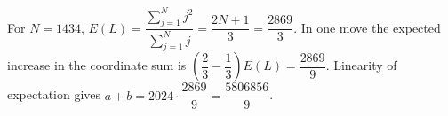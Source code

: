 For $N=1434$, $E(L)=\dfrac{\sum_{j=1}^N j^2}{\sum_{j=1}^N j}=\dfrac{2N+1}{3}=\dfrac{2869}{3}$. In one move the expected increase in the coordinate sum is $(\dfrac{2}{3}-\dfrac{1}{3})E(L)=\dfrac{2869}{9}$. Linearity of expectation gives $a+b=2024\cdot\dfrac{2869}{9}=\boxed{\dfrac{5806856}{9}}$.
